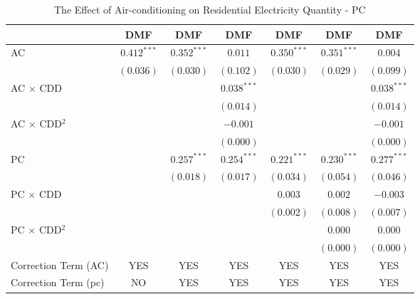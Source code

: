 
\begin{table}[htbp]
\caption{The Effect of Air-conditioning on Residential Electricity Quantity - PC}
\begin{center}
\begin{tabular}{l c c c c c c}
\hline
 & DMF & DMF & DMF & DMF & DMF & DMF \\
\hline
AC                      & $0.412^{***}$ & $0.352^{***}$ & $0.011$       & $0.350^{***}$ & $0.351^{***}$ & $0.004$       \\
                        & $(0.036)$     & $(0.030)$     & $(0.102)$     & $(0.030)$     & $(0.029)$     & $(0.099)$     \\
AC $\times$ CDD         &               &               & $0.038^{***}$ &               &               & $0.038^{***}$ \\
                        &               &               & $(0.014)$     &               &               & $(0.014)$     \\
AC $\times$ CDD$^2$     &               &               & $-0.001$      &               &               & $-0.001$      \\
                        &               &               & $(0.000)$     &               &               & $(0.000)$     \\
PC                      &               & $0.257^{***}$ & $0.254^{***}$ & $0.221^{***}$ & $0.230^{***}$ & $0.277^{***}$ \\
                        &               & $(0.018)$     & $(0.017)$     & $(0.034)$     & $(0.054)$     & $(0.046)$     \\
PC $\times$ CDD         &               &               &               & $0.003$       & $0.002$       & $-0.003$      \\
                        &               &               &               & $(0.002)$     & $(0.008)$     & $(0.007)$     \\
PC $\times$ CDD$^2$     &               &               &               &               & $0.000$       & $0.000$       \\
                        &               &               &               &               & $(0.000)$     & $(0.000)$     \\
\hline
Correction Term (AC)    & YES           & YES           & YES           & YES           & YES           & YES           \\
Correction Term (pc)    & NO            & YES           & YES           & YES           & YES           & YES           \\

\end{tabular}
\end{center}
\end{table}
